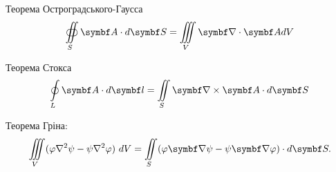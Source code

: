 Теорема Остроградського-Гаусса
\begin{equation}\label{OGTheorem}
	\oiint\limits_S \vect{A}\cdot d\vect{S} = \iiint\limits_V \divg\vect{A} dV
\end{equation}

Теорема Стокса
\begin{equation}\label{Stoksheorem}
	\oint\limits_L \vect{A}\cdot d\vect{l} = \iint\limits_S \rot\vect{A} \cdot d\vect{S}
\end{equation}

Теорема Гріна:
\begin{equation}\label{Grin}
	\iiint\limits_{V}(\varphi \nabla ^{2}\psi -\psi \nabla ^{2}\varphi )\ dV=\iint \limits _{S}(\varphi \vect{\nabla} \psi -\psi \vect{\nabla} \varphi )\cdot d\vect{S}.
\end{equation}
%
%
%
